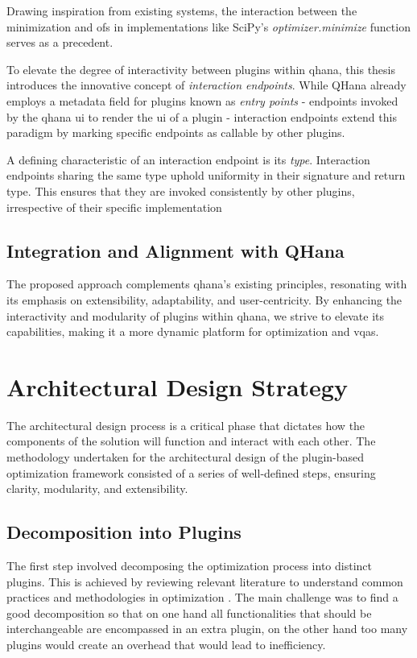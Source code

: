 \documentclass[
  a4paper,  %
  twoside,  %
  bibliography=totoc,
  headsepline,
  cleardoublepage=empty,
  parskip=half,
  draft=false
]{scrbook}
\begin{document}
Drawing inspiration from existing systems, the interaction between the minimization and \glspl{of} in implementations like SciPy's \emph{optimizer.minimize} \cite{Virtanen2020} function serves as a precedent.

To elevate the degree of interactivity between plugins within \gls{qhana}, this thesis introduces the innovative concept of \emph{interaction endpoints}.
While QHana already employs a metadata field for plugins known as \emph{entry points} - endpoints invoked by the \gls{qhana} \gls{ui} to render the \gls{ui} of a plugin - interaction endpoints extend this paradigm by marking specific endpoints as callable by other plugins.

A defining characteristic of an interaction endpoint is its \emph{type}.
Interaction endpoints sharing the same type uphold uniformity in their signature and return type.
This ensures that they are invoked consistently by other plugins, irrespective of their specific implementation

\subsection{Integration and Alignment with QHana}
The proposed approach complements \gls{qhana}'s existing principles, resonating with its emphasis on extensibility, adaptability, and user-centricity.
By enhancing the interactivity and modularity of plugins within \gls{qhana}, we strive to elevate its capabilities, making it a more dynamic platform for optimization and \glspl{vqa}.

\section{Architectural Design Strategy}
\label{sec:architecturalDesignStrategy}

The architectural design process is a critical phase that dictates how the components of the solution will function and interact with each other.
The methodology undertaken for the architectural design of the plugin-based optimization framework consisted of a series of well-defined steps, ensuring clarity, modularity, and extensibility.

\subsection{Decomposition into Plugins}
The first step involved decomposing the optimization process into distinct plugins.
This is achieved by reviewing relevant literature to understand common practices and methodologies in optimization \cite{Virtanen2020, Nocedal2006, ShalevShwartz2014, Weinan2017}.
The main challenge was to find a good decomposition so that on one hand all functionalities that should be interchangeable are encompassed in an extra plugin,
on the other hand too many plugins would create an overhead that would lead to inefficiency.
\end{document}
